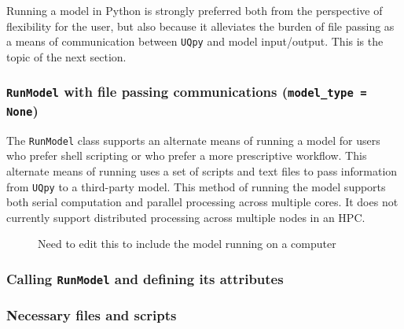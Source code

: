 \documentclass[./UsersGuide.tex]{subfiles}
\begin{document}
Running a model in Python is strongly preferred both from the perspective of flexibility for the user, but also because it alleviates the burden of file passing as a means of communication between \texttt{UQpy} and model input/output. This is the topic of the next section.

\subsubsection{\texttt{RunModel} with file passing communications (\texttt{model\_type = None})}
The \texttt{RunModel} class supports an alternate means of running a model for users who prefer shell scripting or who prefer a more prescriptive workflow. This alternate means of running uses a set of scripts and text files to pass information from \texttt{UQpy} to a third-party model. This method of running the model supports both serial computation and parallel processing across multiple cores. It does not currently support distributed processing across multiple nodes in an HPC. 

\begin{figure}[!ht]
	\caption{}
	\label{template_model}
\end{figure}

\begin{figure}[!ht]
	\caption{}
	\label{template_model}
\end{figure}


\begin{figure}[!ht]
	\caption{Need to edit this to include the model running on a computer}
	\label{template_model}
\end{figure}

\begin{figure}[!ht]
	\caption{}
	\label{template_model}
\end{figure}

\subsubsection{Calling \texttt{RunModel} and defining its attributes}
\label{sec:RM_attributes}

\subsubsection{Necessary files and scripts}
\end{document}
